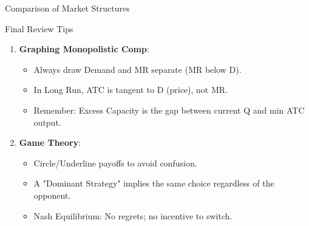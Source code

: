 \documentclass[aspectratio=169]{beamer}
\begin{document}
\begin{frame}{Comparison of Market Structures}
    \begin{table}
    \centering
    \end{table}
\end{frame}

\begin{frame}{Final Review Tips}
    \begin{enumerate}
        \item \textbf{Graphing Monopolistic Comp}:
        \begin{itemize}
            \item Always draw Demand and MR separate (MR below D).
            \item In Long Run, ATC is tangent to D (price), not MR.
            \item Remember: Excess Capacity is the gap between current Q and min ATC output.
        \end{itemize}
        \item \textbf{Game Theory}:
        \begin{itemize}
            \item Circle/Underline payoffs to avoid confusion.
            \item A "Dominant Strategy" implies the same choice regardless of the opponent.
            \item Nash Equilibrium: No regrets; no incentive to switch.
        \end{itemize}
    \end{enumerate}
\end{frame}
\end{document}
